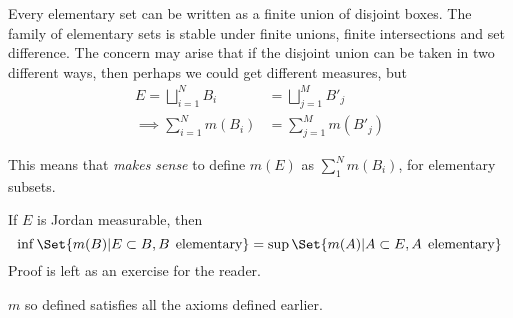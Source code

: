 \documentclass{article}
\newcommand{\1}[1]{\mathbbm{1}_{#1}}
\begin{document}

\begin{remark}
    Every elementary set can be written as a finite union of disjoint boxes.
    The family of elementary sets is stable under finite unions, finite intersections and set difference.
    The concern may arise that if the disjoint union can be taken in two different ways, then perhaps we could get different measures, but
    \begin{align*}
        E = \bigsqcup_{i=1}^N B_i &= \bigsqcup_{j=1}^M B'_j \\
        \implies \sum_{i=1}^N m(B_i) &= \sum_{j=1}^M m(B'_j)
    \end{align*}

    This means that \emph{makes sense} to define $m(E)$ as $\sum_1^N m(B_i)$, for elementary subsets.
\end{remark}


\begin{remark}
    If $E$ is Jordan measurable, then
    \begin{equation*}
        \inf\Set{m(B)| E \subset B, B \,\; \text{elementary}} = \sup\Set{m(A)| A \subset E, A \;\, \text{elementary}}
    \end{equation*}
    Proof is left as an exercise for the reader.
\end{remark}


\begin{exercise}
    $m$ so defined satisfies all the axioms defined earlier.
\end{exercise}
\end{document}
